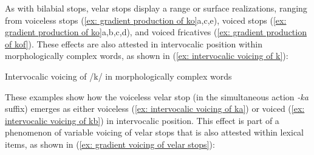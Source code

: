 As with bilabial stops, velar stops display a range or surface realizations, ranging from voiceless stops (\ref{ex: gradient production of ko}a,c,e), voiced stops (\ref{ex: gradient production of ko}a,b,c,d), and voiced fricatives (\ref{ex: gradient production of kof}). These effects are also attested in intervocalic position within morphologically complex words, as shown in (\ref{ex: intervocalic voicing of k}):


\ea\label{ex: intervocalic voicing of k}
{Intervocalic voicing of /k/ in morphologically complex words}

    \label{ex: intervocalic voicing of ka}
        \label{ex: intervocalic voicing of kb}
    \z
\z

These examples show how the voiceless velar stop (in the simultaneous action \textit{-ka} suffix) emerges as either voiceless (\ref{ex: intervocalic voicing of ka}) or voiced (\ref{ex: intervocalic voicing of kb}) in intervocalic position. This effect is part of a phenomenon of variable voicing of velar stops that is also attested within lexical items, as shown in (\ref{ex: gradient voicing of velar stops}):

